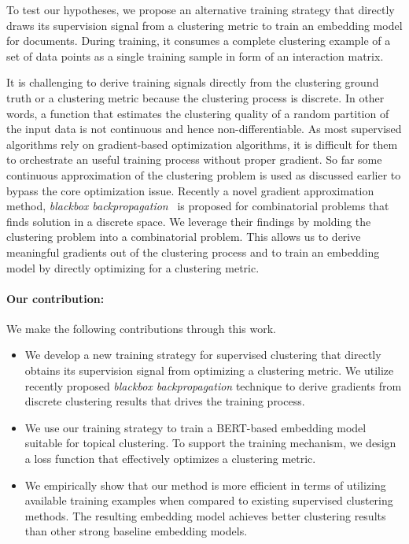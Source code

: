 \documentclass[11pt,a4paper]{article}
\begin{document}
To test our hypotheses, we propose an alternative training strategy that directly draws its supervision signal from a clustering metric to train an embedding model for documents. During training, it consumes a complete clustering example of a set of data points as a single training sample in form of an interaction matrix.  

It is challenging to derive training signals directly from the clustering ground truth or a clustering metric because the clustering process is discrete. In other words, a function that estimates the clustering quality of a random partition of the input data is not continuous and hence non-differentiable. As most supervised algorithms rely on gradient-based optimization algorithms, it is difficult for them to orchestrate an useful training process without proper gradient. So far some continuous approximation of the clustering problem is used as discussed earlier to bypass the core optimization issue. Recently a novel gradient approximation method, \textit{blackbox backpropagation}~\cite{vlastelica2019differentiation} is proposed for combinatorial problems that finds solution in a discrete space. We leverage their findings by molding the clustering problem into a combinatorial problem. This allows us to derive meaningful gradients out of the clustering process and to train an embedding model by directly optimizing for a clustering metric.

\paragraph{Our contribution:} We make the following contributions through this work.
\begin{itemize}
    \item We develop a new training strategy for supervised clustering that directly obtains its supervision signal from optimizing a clustering metric. We utilize recently proposed \textit{blackbox backpropagation} technique to derive gradients from discrete clustering results that drives the training process.
    \item We use our training strategy to train a BERT-based embedding model suitable for topical clustering. To support the training mechanism, we design a loss function that effectively optimizes a clustering metric.
    \item We empirically show that our method is more efficient in terms of utilizing available training examples when compared to existing supervised clustering methods. The resulting embedding model achieves better clustering results than other strong baseline embedding models.
\end{itemize}
\end{document}
